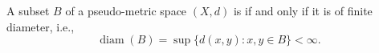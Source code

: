 A subset $B$ of a pseudo-metric space $(X, d)$ is  if and only if it is of finite diameter, i.e.,
$$\operatorname{diam}(B) = \sup\{d(x, y) : x, y \in B\} < \infty.$$
